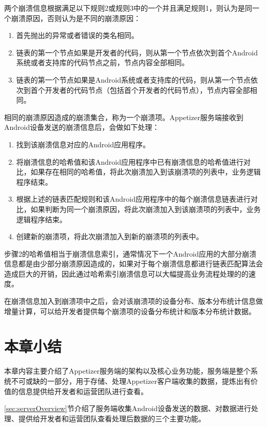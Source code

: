 两个崩溃信息根据满足以下规则2或规则3中的一个并且满足规则1，则认为是同一个崩溃原因，否则认为是不同的崩溃原因：

\begin{enumerate}
	\item 首先抛出的异常或者错误的类名相同。
	\item 链表的第一个节点如果是开发者的代码，则从第一个节点依次到首个Android系统或者支持库的代码节点之前，节点内容全部相同。
	\item 链表的第一个节点如果是Android系统或者支持库的代码，则从第一个节点依次到首个开发者的代码节点（包括首个开发者的代码节点），节点内容全部相同。
\end{enumerate}

相同的崩溃原因造成的崩溃集合，称为一个崩溃项。Appetizer服务端接收到Android设备发送的崩溃信息后，会做如下处理：

\begin{enumerate}
	\item 找到该崩溃信息对应的Android应用程序。
	\item 将崩溃信息的哈希值和该Android应用程序中已有崩溃信息的哈希值进行对比，如果存在相同的哈希值，将此次崩溃加入到该崩溃项的列表中，业务逻辑程序结束。
	\item 根据上述的链表匹配规则和该Android应用程序中的每个崩溃信息链表进行对比，如果判断为同一个崩溃原因，将此次崩溃加入到该崩溃项的列表中，业务逻辑程序结束。
	\item 创建新的崩溃项，将此次崩溃加入到新的崩溃项的列表中。
\end{enumerate} 

步骤2的哈希值相当于崩溃信息索引，通常情况下一个Android应用的大部分崩溃信息都是由少部分崩溃原因造成的，如果对于每个崩溃信息都进行链表匹配算法会造成巨大的开销，因此通过哈希索引崩溃信息可以大幅提高业务流程处理的的速度。

在崩溃信息加入到崩溃项中之后，会对该崩溃项的设备分布、版本分布统计信息做增量计算，可以给开发者提供每个崩溃项的设备分布统计和版本分布统计数据。

\section{本章小结}

本章内容主要介绍了Appetizer服务端的架构以及核心业务功能，服务端是整个系统不可或缺的一部分，用于存储、处理Appetizer客户端收集的数据，提炼出有价值的信息提供给开发者和运营团队进行查看。

\ref{sec:serverOverview}节介绍了服务端收集Android设备发送的数据、对数据进行处理、提供给开发者和运营团队查看处理后数据的三个主要功能。

